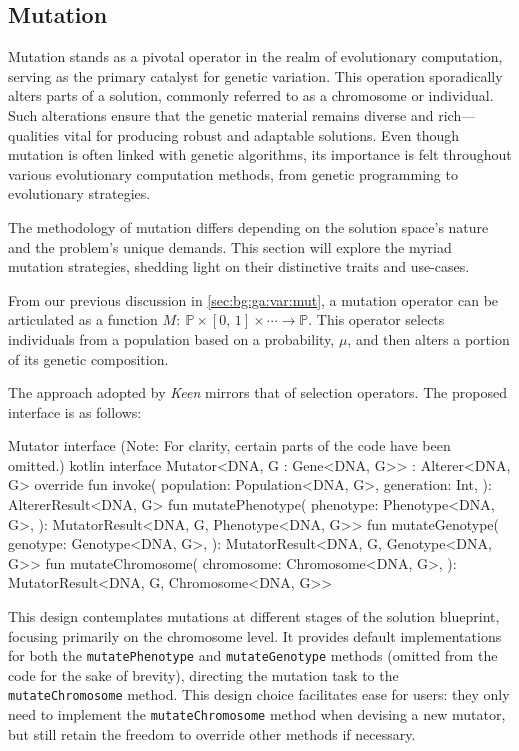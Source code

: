 \subsection{Mutation}
\label{sec:keen:operators:mutation}
  Mutation stands as a pivotal operator in the realm of evolutionary 
  computation, serving as the primary catalyst for genetic variation.
  This operation sporadically alters parts of a solution, commonly referred to 
  as a chromosome or individual. Such alterations ensure that the genetic 
  material remains diverse and rich—qualities vital for producing robust and 
  adaptable solutions. Even though mutation is often linked with genetic 
  algorithms, its importance is felt throughout various evolutionary 
  computation methods, from genetic programming to evolutionary strategies.

  The methodology of mutation differs depending on the solution space's nature 
  and the problem's unique demands. This section will explore the myriad 
  mutation strategies, shedding light on their distinctive traits and use-cases.

  From our previous discussion in \vref{sec:bg:ga:var:mut}, a mutation operator 
  can be articulated as a function \(M :\: \mathbb{P} \times [0,\, 1] \times 
  \cdots \to \mathbb{P}\). This operator selects individuals from a population 
  based on a probability, \(\mu\), and then alters a portion of its genetic 
  composition.

  The approach adopted by \textit{Keen} mirrors that of selection operators. 
  The proposed interface is as follows:

  \begin{code}{
      Mutator interface (Note: For clarity, certain parts of the code have been omitted.)
    }{}{kotlin}
      interface Mutator<DNA, G : Gene<DNA, G>> : Alterer<DNA, G> {
          override fun invoke(
              population: Population<DNA, G>,
              generation: Int,
          ): AltererResult<DNA, G>
          fun mutatePhenotype(
              phenotype: Phenotype<DNA, G>,
          ): MutatorResult<DNA, G, Phenotype<DNA, G>>
          fun mutateGenotype(
              genotype: Genotype<DNA, G>,
          ): MutatorResult<DNA, G, Genotype<DNA, G>>
          fun mutateChromosome(
              chromosome: Chromosome<DNA, G>,
          ): MutatorResult<DNA, G, Chromosome<DNA, G>>
      }
    \end{code}

  This design contemplates mutations at different stages of the solution 
  blueprint, focusing primarily on the chromosome level. It provides default 
  implementations for both the \texttt{mutatePhenotype} and 
  \texttt{mutateGenotype} methods (omitted from the code for the sake of 
  brevity), directing the mutation task to the \texttt{mutateChromosome} 
  method. This design choice facilitates ease for users: they only need to 
  implement the \texttt{mutateChromosome} method when devising a new mutator, 
  but still retain the freedom to override other methods if necessary.

